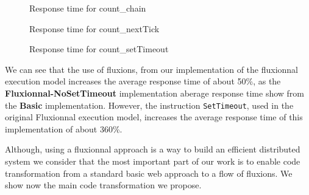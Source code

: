 \begin{figure}

\caption{Response time for count\_chain}
\label{fig:timecountchain}
\end{figure}

\begin{figure}

\caption{Response time for count\_nextTick}
\label{fig:timecountnextTick}
\end{figure}

\begin{figure}

\caption{Response time for count\_setTimeout}
\label{fig:timecountsetTimeout}
\end{figure}


We can see that the use of fluxions, from our implementation of the fluxionnal execution model increases the average response time of about 50\%, as the \textbf{Fluxionnal-NoSetTimeout} implementation aberage response time show from the \textbf{Basic} implementation.
However, the instruction \texttt{SetTimeout}, used in the original Fluxionnal execution model, increases the average response time of this implementation of about 360\%.



\TODO{}
Although, using a fluxionnal approach is a way to build an efficient distributed system we consider that the most important part of our work is to enable code transformation from a standard basic web approach to a flow of fluxions.
We show now the main code transformation we propose.